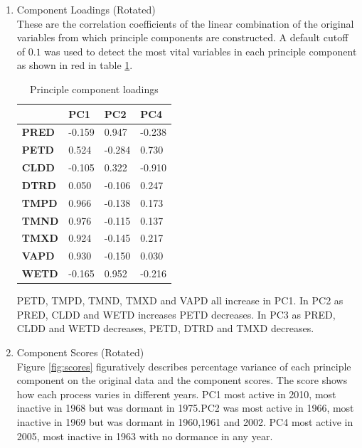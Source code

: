 \documentclass[12pt,a4paper]{article}
\begin{document}
\begin{enumerate}[label=\roman*)]
\item Component Loadings (Rotated)\\
These are the correlation coefficients of the linear combination of the original variables from which principle components are constructed.
A default cutoff of $0.1$ was used to detect the most vital variables in each principle component as shown in red in table \ref{load}.
\begin{table}[h]
	\centering
	\begin{tabular}{|l|l|l|l|}
		\hline
		& \textbf{PC1}                 & \textbf{PC2}                  & \textbf{PC4}                  \\ \hline
		\textbf{PRED} & -0.159                       & {\color[HTML]{FE0000} 0.947}  & {\color[HTML]{FE0000} -0.238} \\ \hline
		\textbf{PETD} & {\color[HTML]{FE0000} 0.524} & {\color[HTML]{FE0000} -0.284} & {\color[HTML]{FE0000} 0.730}  \\ \hline
		\textbf{CLDD} & -0.105                       & {\color[HTML]{FE0000} 0.322}  & {\color[HTML]{FE0000} -0.910} \\ \hline
		\textbf{DTRD} & 0.050                        & -0.106                        & {\color[HTML]{FE0000} 0.247}  \\ \hline
		\textbf{TMPD} & {\color[HTML]{FE0000} 0.966} & -0.138                        & 0.173                         \\ \hline
		\textbf{TMND} & {\color[HTML]{FE0000} 0.976} & -0.115                        & 0.137                         \\ \hline
		\textbf{TMXD} & {\color[HTML]{FE0000} 0.924} & -0.145                        & {\color[HTML]{FE0000} 0.217}  \\ \hline
		\textbf{VAPD} & {\color[HTML]{FE0000} 0.930} & -0.150                        & 0.030                         \\ \hline
		\textbf{WETD} & -0.165                       & {\color[HTML]{FE0000} 0.952}  & {\color[HTML]{FE0000} -0.216} \\ \hline
	\end{tabular}
\caption{Principle component loadings}
\label{load}
\end{table}

PETD, TMPD, TMND, TMXD and VAPD all increase in PC1. In PC2 as PRED, CLDD and WETD increases PETD decreases. In PC3 as PRED, CLDD and WETD decreases, PETD, DTRD and TMXD decreases.
\newpage
\item Component Scores (Rotated)\\
Figure \ref*{fig:scores} figuratively describes percentage variance of each principle component on the original data and the component scores. The score shows how each process varies in different years. PC1 most active in 2010, most inactive in 1968 but was dormant in 1975.PC2 was most active in 1966, most inactive in 1969 but was dormant in 1960,1961 and 2002. PC4 most active in 2005, most inactive in 1963 with no dormance in any year.


\end{enumerate}
\end{document}

